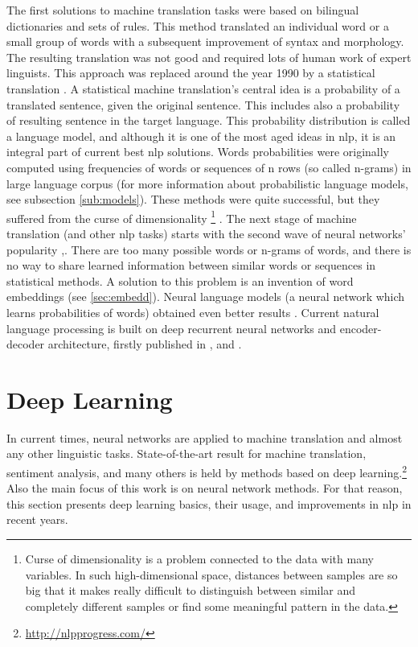 The first solutions to machine translation tasks were based on bilingual dictionaries and sets of rules. This method translated an individual word or a small group of words with a subsequent improvement of syntax and morphology. The resulting translation was not good and required lots of human work of expert linguists. This approach was replaced around the year 1990 by a statistical translation \citep{Brown}. A statistical machine translation's central idea is a probability of a translated sentence, given the original sentence. This includes also a probability of resulting sentence in the target language. This probability distribution is called a language model, and although it is one of the most aged ideas in \acrshort{nlp}, it is an integral part of current best \acrshort{nlp} solutions. Words probabilities were originally computed using frequencies of words or sequences of n rows (so called n-grams) in large language corpus \citep{jurafsky2012natural} (for more information about probabilistic language models, see subsection \ref{sub:models}). These methods were quite successful, but they suffered from the curse of dimensionality \footnote{Curse of dimensionality is a problem connected to the data with many variables. In such high-dimensional space, distances between samples are so big that it makes really difficult to distinguish between similar and completely different samples or find some meaningful pattern in the data.} \citep[p.450]{Goodfellow-et-al-2016}. The next stage of machine translation (and other \acrshort{nlp} tasks) starts with the second wave of neural networks' popularity \citep{Goldberg},\citep{Google}. There are too many possible words or n-grams of words, and there is no way to share learned information between similar words or sequences in statistical methods. A solution to this problem is an invention of word embeddings \citep{Bengio2003} (see \ref{sec:embedd}). Neural language models (a neural network which learns probabilities of words) obtained even better results \citep{Schwenk2006}. Current natural language processing is built on deep recurrent neural networks and encoder-decoder architecture, firstly published in \citep{Cho2014}, \citep{Sutskever2014} and \citep{Wu2016}. 
\section{Deep Learning}
In current times, neural networks are applied to machine translation and almost any other linguistic tasks. State-of-the-art result for machine translation, sentiment analysis, and many others is held by methods based on deep learning.\footnote{\url{http://nlpprogress.com/}} Also the main focus of this work is on neural network methods. For that reason, this section presents deep learning basics, their usage, and improvements in \acrshort{nlp} in recent years. 

